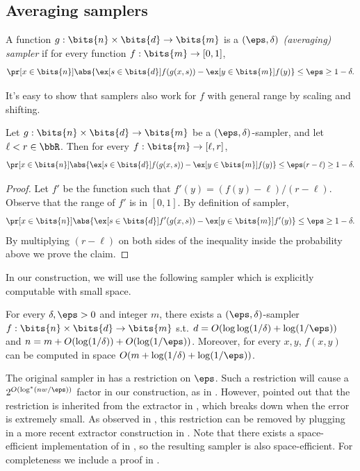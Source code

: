 \subsection{Averaging samplers}
\begin{definition}
A function $g:\bits{n}\times\bits{d}\to\bits{m}$ is a \emph{$(\eps,\delta)$ (averaging) sampler} if for every function $f:\bits{m}\to{[0,1]}$, 
$$\pr[x\in\bits{n}]{\abs{\ex[s\in\bits{d}]{f(g(x,s))}-\ex[y\in\bits{m}]{f(y)}}\le\eps}\ge 1-\delta.$$
\end{definition}
\noindent
It's easy to show that samplers also work for $f$ with general range by scaling and shifting.
\begin{claim}\label{lemma:sampler-general}
Let $g:\bits{n}\times\bits{d}\to\bits{m}$ be a $(\eps,\delta)$-sampler, and let $\ell<r\in\bbR$. Then for every $f:\bits{m}\to{[\ell,r]}$, 
$$\pr[x\in\bits{n}]{\abs{\ex[s\in\bits{d}]{f(g(x,s))}-\ex[y\in\bits{m}]{f(y)}}\le\eps(r-\ell)}\ge 1-\delta.$$
\end{claim}
\begin{proof}
Let $f'$ be the function such that $f'(y)=(f(y)-\ell)/(r-\ell)$. Observe that the range of $f'$ is in $[0,1]$. By definition of sampler, 
$$\pr[x\in\bits{n}]{\abs{\ex[s\in\bits{d}]{f'(g(x,s))}-\ex[y\in\bits{m}]{f'(y)}}\le\eps}\ge 1-\delta.$$
By multiplying $(r-\ell)$ on both sides of the inequality inside the probability above we prove the claim.
\end{proof}
In our construction, we will use the following sampler which is explicitly computable with small space.
\begin{lemma}\label{lemma:samp-opt}
For every $\delta,\eps>0$ and integer $m$, there exists a $(\eps,\delta)$-sampler $f:\bits{n}\times\bits{d}\to\bits{m}$ s.t. $d=O(\log\log(1/\delta)+\log(1/\eps))$ and $n=m+O(\log(1/\delta))+O(\log(1/\eps))$. Moreover, for every $x,y$, $f(x,y)$ can be computed in space $O(m+\log(1/\delta)+\log(1/\eps))$.
\end{lemma}
\begin{remark}
The original sampler in \cite{RVW01} has a restriction on $\eps$. Such a restriction will cause a $2^{O(\log^*(nw/\eps))}$ factor in our construction, as in \cite{BCG18}. However, \cite{RVW01} pointed out that the restriction is inherited from the extractor in \cite{Zuc97}, which breaks down when the error is extremely small. As observed in \cite{Gol11}, this restriction can be removed by plugging in a more recent extractor construction in \cite{GUV09}. Note that there exists a space-efficient implementation of \cite{GUV09} in \cite{KNW08}, so the resulting sampler is also space-efficient. For completeness we include a proof in .
\end{remark}
